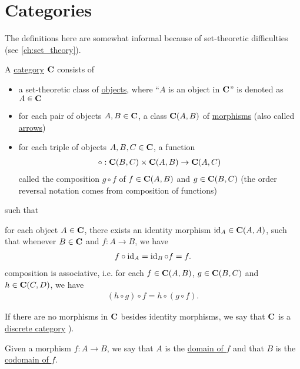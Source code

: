\section{Categories}\label{sec:categories}

\begin{note}
  The definitions here are somewhat informal because of set-theoretic difficulties (see \cref{ch:set_theory}).
\end{note}

\begin{definition}\label{def:category}\cite[definition 1.1.1]{Leinster2014}
  A \ul{category} $\operatorname{\mathbf{C}}$ consists of
  \begin{itemize}
    \item a set-theoretic class of \ul{objects}, where \enquote{$A$ is an object in $\operatorname{\mathbf{C}}$} is denoted as $A \in \operatorname{\mathbf{C}}$
    \item for each pair of objects $A, B \in \operatorname{\mathbf{C}}$, a class ${\operatorname{\mathbf{C}}}(A, B)$ of \ul{morphisms} (also called \ul{arrows})
    \item for each triple of objects $A, B, C \in \operatorname{\mathbf{C}}$, a function
    \begin{align*}
      \circ: {\operatorname{\mathbf{C}}}(B, C) \times {\operatorname{\mathbf{C}}}(A, B) \to {\operatorname{\mathbf{C}}}(A, C)
    \end{align*}
    called the composition $g \circ f$ of $f \in {\operatorname{\mathbf{C}}}(A, B)$ and $g \in {\operatorname{\mathbf{C}}}(B, C)$ (the order reversal notation comes from composition of functions)
  \end{itemize}
  such that
  \begin{description}
     for each object $A \in \operatorname{\mathbf{C}}$, there exists an identity morphism $\operatorname{id}_A \in {\operatorname{\mathbf{C}}}(A, A)$, such that whenever $B \in \operatorname{\mathbf{C}}$ and $f: A \to B$, we have
    \begin{align*}
      f \circ \operatorname{id}_A = \operatorname{id}_B \circ f = f.
    \end{align*}
     composition is associative, i.e. for each $f \in {\operatorname{\mathbf{C}}}(A, B)$, $g \in {\operatorname{\mathbf{C}}}(B, C)$ and $h \in {\operatorname{\mathbf{C}}}(C, D)$, we have
    \begin{align*}
      (h \circ g) \circ f = h \circ (g \circ f).
    \end{align*}
  \end{description}

  If there are no morphisms in $\operatorname{\mathbf{C}}$ besides identity morphisms, we say that $\operatorname{\mathbf{C}}$ is a \ul{discrete category} \cite[example 1.1.18(b]{Leinster2014}).

  Given a morphism $f: A \to B$, we say that $A$ is the \ul{domain of $f$} and that $B$ is the \ul{codomain of $f$}.
\end{definition}

